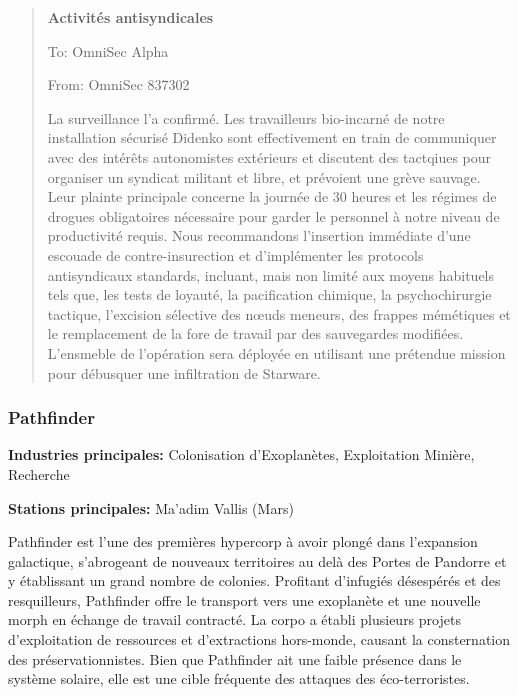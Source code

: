                      \begin{quotation} \textbf{Activités antisyndicales} 

                        To: OmniSec Alpha 

                        From: OmniSec 837302 

                        La surveillance l'a confirmé. Les travailleurs bio-incarné de notre installation sécurisé Didenko sont effectivement en train de communiquer avec des intérêts autonomistes extérieurs et discutent des tactqiues pour organiser un syndicat militant et libre, et prévoient une grève sauvage. Leur plainte principale concerne la journée de 30 heures et les régimes de drogues obligatoires nécessaire pour garder le personnel à notre niveau de productivité requis. Nous recommandons l'insertion immédiate d'une escouade de contre-insurection et d'implémenter les protocols antisyndicaux standards, incluant, mais non limité aux moyens habituels tels que, les tests de loyauté, la pacification chimique, la psychochirurgie tactique, l'excision sélective des nœuds meneurs, des frappes mémétiques et le remplacement de la fore de travail par des sauvegardes modifiées. L'ensmeble de l'opération sera déployée en utilisant une prétendue mission pour débusquer une infiltration de Starware. \end{quotation} 

                        \subsubsection{Pathfinder} \label{sec:pathfinder} 

                        \textbf{Industries principales:} Colonisation d'Exoplanètes, Exploitation Minière, Recherche 

                        \textbf{Stations principales:} Ma'adim Vallis (Mars) 

                        Pathfinder est l'une des premières hypercorp à avoir plongé dans l'expansion galactique, s'abrogeant de nouveaux territoires au delà des Portes de Pandorre et y établissant un grand nombre de colonies. Profitant d'infugiés désespérés et des resquilleurs, Pathfinder offre le transport vers une exoplanète et une nouvelle morph en échange de travail contracté. La corpo a établi plusieurs projets d'exploitation de ressources et d'extractions hors-monde, causant la consternation des préservationnistes. Bien que Pathfinder ait une faible présence dans le système solaire, elle est une cible fréquente des attaques des éco-terroristes. 

